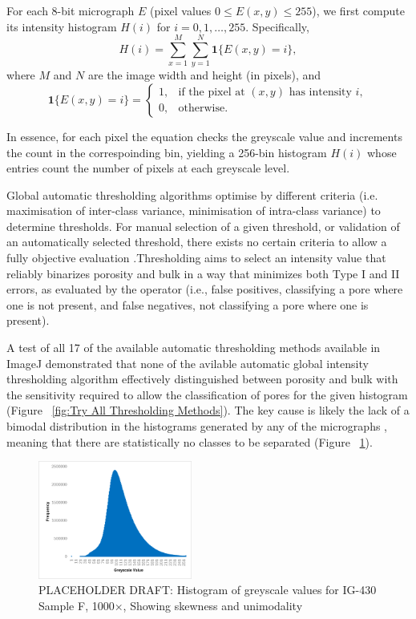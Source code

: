 \documentclass[3p,twocolumn]{elsarticle}
\begin{document}
For each 8-bit micrograph \(E\) (pixel values \(0 \le E(x,y) \le 255\)), we
first compute its intensity histogram \(H(i)\) for \(i=0,1,\dots,255\).
Specifically,
\[
H(i) = \sum_{x=1}^{M}\sum_{y=1}^{N} \mathbf{1}\{E(x,y)=i\},
\]
where \(M\) and \(N\) are the image width and height (in pixels), and
\[
\mathbf{1}\{E(x,y)=i\} =
\begin{cases}
1, & \text{if the pixel at }(x,y)\text{ has intensity }i,\\
0, & \text{otherwise.}
\end{cases}
\]

  In essence, for each pixel the equation checks the greyscale value and increments
  the count in the correspoinding bin, yielding a 256-bin histogram \(H(i)\) whose entries
  count the number of pixels at each greyscale level. 

	Global automatic thresholding algorithms optimise by different
	criteria (i.e. maximisation of inter-class variance, minimisation of
	intra-class variance) to determine thresholds. For manual selection of a given
	threshold, or validation of an automatically selected threshold, there exists
	no certain criteria to allow a fully objective evaluation
	\citep{Huang2019}.Thresholding aims to select an intensity value that reliably
	binarizes porosity and bulk in a way that minimizes both Type I and II errors,
	as evaluated by the operator (i.e., false positives, classifying a pore where
	one is not present, and false negatives, not classifying a pore where one is
	present).

  A test of all 17 of the available automatic thresholding methods available in
  ImageJ demonstrated that none of the avilable automatic global intensity
  thresholding algorithm effectively distinguished between porosity and bulk
  with the sensitivity required to allow the classification of pores for the
  given histogram (Figure ~\ref{fig:Try All Thresholding Methods}). The key
  cause is likely the lack of a bimodal distribution in the histograms generated
  by any of the micrographs , meaning that there are statistically no classes to
  be separated (Figure ~\ref{fig:histogramnobimodal}). 
    \begin{figure}
		\centering
    \includegraphics[width=0.45\textwidth]{./Media/IG430F Greyscale Histogram.png}
		\caption{PLACEHOLDER DRAFT: Histogram of greyscale values for IG-430 Sample F, 1000×, Showing skewness and unimodality}
		\label{fig:histogramnobimodal}
	\end{figure} 
\end{document}
